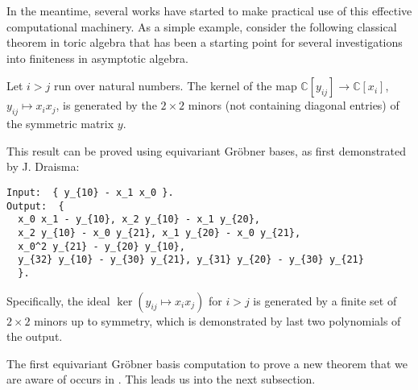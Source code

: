 In the meantime, several works have started to make practical use of this effective computational machinery.  As a simple example, consider 
the following classical theorem in toric algebra that has been a starting point for several investigations into finiteness in asymptotic algebra.

\begin{theorem}\label{toric2x2}
Let $i > j$ run over natural numbers.  The kernel of the map $\mathbb C[y_{ij}] \to \mathbb C[x_i]$, $y_{ij} \mapsto x_i x_j$, is generated by the $2 \times 2$ minors (not containing diagonal entries) of the symmetric matrix $y$.
\end{theorem}

This result can be proved using equivariant Gr\"obner bases, as first demonstrated by J. Draisma:
\begin{M2}
\begin{verbatim}
Input:  { y_{10} - x_1 x_0 }.
Output:  { 
  x_0 x_1 - y_{10}, x_2 y_{10} - x_1 y_{20}, 
  x_2 y_{10} - x_0 y_{21}, x_1 y_{20} - x_0 y_{21}, 
  x_0^2 y_{21} - y_{20} y_{10},  
  y_{32} y_{10} - y_{30} y_{21}, y_{31} y_{20} - y_{30} y_{21} 
  }.
\end{verbatim}
\end{M2}  
Specifically, the ideal $\ker{(y_{ij} \mapsto x_i x_j)}$ for $i > j$ is generated by a finite set of $2 \times 2$ minors up to symmetry, 
which is demonstrated by last two polynomials of the output.

The first equivariant Gr\"obner basis computation to prove a new theorem that we are aware of occurs in \cite{Brouwer09e}. This leads us into the next subsection. 
